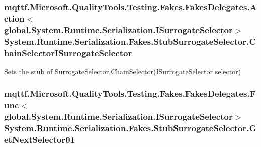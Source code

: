 \hypertarget{class_system_1_1_runtime_1_1_serialization_1_1_fakes_1_1_stub_surrogate_selector_a70f949c8c61b523dde0f97fdfdf63673}{
\subsubsection[{Chain\-Selector\-I\-Surrogate\-Selector}]{\setlength{\rightskip}{0pt plus 5cm}mqttf.\-Microsoft.\-Quality\-Tools.\-Testing.\-Fakes.\-Fakes\-Delegates.\-Action$<$global.\-System.\-Runtime.\-Serialization.\-I\-Surrogate\-Selector$>$ System.\-Runtime.\-Serialization.\-Fakes.\-Stub\-Surrogate\-Selector.\-Chain\-Selector\-I\-Surrogate\-Selector}}\label{class_system_1_1_runtime_1_1_serialization_1_1_fakes_1_1_stub_surrogate_selector_a70f949c8c61b523dde0f97fdfdf63673}


Sets the stub of Surrogate\-Selector.\-Chain\-Selector(\-I\-Surrogate\-Selector selector)

\hypertarget{class_system_1_1_runtime_1_1_serialization_1_1_fakes_1_1_stub_surrogate_selector_a205d01385c4affae26cd907966ef8098}{
\subsubsection[{Get\-Next\-Selector01}]{\setlength{\rightskip}{0pt plus 5cm}mqttf.\-Microsoft.\-Quality\-Tools.\-Testing.\-Fakes.\-Fakes\-Delegates.\-Func$<$global.\-System.\-Runtime.\-Serialization.\-I\-Surrogate\-Selector$>$ System.\-Runtime.\-Serialization.\-Fakes.\-Stub\-Surrogate\-Selector.\-Get\-Next\-Selector01}}\label{class_system_1_1_runtime_1_1_serialization_1_1_fakes_1_1_stub_surrogate_selector_a205d01385c4affae26cd907966ef8098}


